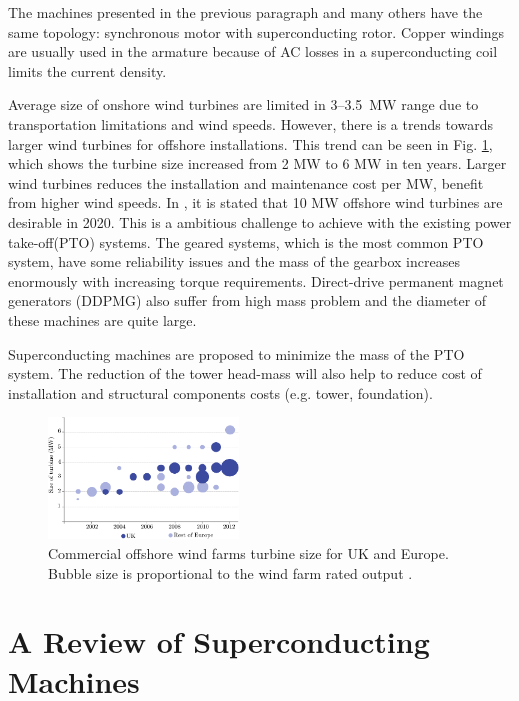 \documentclass[12pt]{IET02}
\begin{document}
The machines presented in the previous paragraph and many others have the same topology: synchronous motor with superconducting rotor. Copper windings are usually used in the armature because of AC losses in a superconducting coil limits the current density. 


Average size of onshore wind turbines are limited in 3--3.5~MW range due to transportation limitations and wind speeds. However, there is a trends towards larger wind turbines for offshore installations. This trend can be seen in Fig. \ref{offshore-turbine-size}, which shows the turbine size increased from 2 MW to 6 MW in ten years. Larger wind turbines reduces the installation and maintenance cost per MW, benefit from higher wind speeds. In \cite{Abrahamsen2010}, it is stated that 10 MW offshore wind turbines are desirable in 2020. This is a ambitious challenge to achieve with the existing power take-off(PTO) systems. The geared systems, which is the most common PTO system, have some reliability issues and the mass of the gearbox increases enormously with increasing torque requirements. Direct-drive permanent magnet generators (DDPMG) also suffer from high mass problem and the diameter of these machines are quite large. 

Superconducting machines are proposed to minimize the mass of the PTO system. The reduction of the tower head-mass will also help to reduce cost of installation and structural components costs (e.g. tower, foundation).

\begin{figure}[]
  \centering
  \includegraphics[width=0.45\textwidth]{offshore-turbine-size}
\caption{Commercial offshore wind farms turbine size for UK and Europe. Bubble size is proportional to the wind farm rated output \cite{bvg}.}
  \label{offshore-turbine-size}
\end{figure}





\section{A Review of Superconducting Machines}
\end{document}
